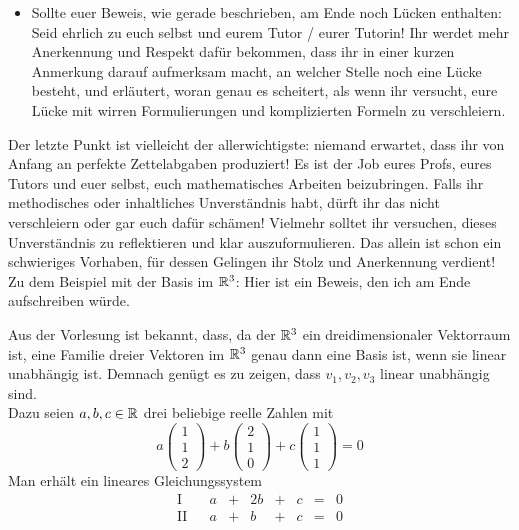 \begin{de}
\begin{itemize}
        \item Sollte euer Beweis, wie gerade beschrieben, am Ende noch Lücken enthalten: Seid ehrlich zu euch selbst und eurem Tutor / eurer Tutorin! Ihr werdet mehr Anerkennung und Respekt dafür bekommen, dass ihr in einer kurzen Anmerkung darauf aufmerksam macht, an welcher Stelle noch eine Lücke besteht, und erläutert, woran genau es scheitert, als wenn ihr versucht, eure Lücke mit wirren Formulierungen und komplizierten Formeln zu verschleiern.
    \end{itemize}
    Der letzte Punkt ist vielleicht der allerwichtigste: niemand erwartet, dass ihr von Anfang an perfekte Zettelabgaben produziert! Es ist der Job eures Profs,  eures Tutors und euer selbst, euch mathematisches Arbeiten beizubringen. Falls ihr methodisches oder inhaltliches Unverständnis habt, dürft ihr das nicht verschleiern oder gar euch dafür schämen! Vielmehr solltet ihr versuchen, dieses Unverständnis zu reflektieren und klar auszuformulieren. Das allein ist schon ein schwieriges Vorhaben, für dessen Gelingen ihr Stolz und Anerkennung verdient! \\[0.5em]
    Zu dem Beispiel mit der Basis im $\mathbb R^3$: Hier ist ein Beweis, den ich am Ende aufschreiben würde.
    \begin{bew}
        Aus der Vorlesung ist bekannt, dass, da der $\mathbb R^3$ ein dreidimensionaler Vektorraum ist, eine Familie dreier Vektoren im $\mathbb R^3$ genau dann eine Basis ist, wenn sie linear unabhängig ist. Demnach genügt es zu zeigen, dass $v_1,v_2,v_3$ linear unabhängig sind. \\[0.5em]
        Dazu seien $a,b,c\in \mathbb R$ drei beliebige reelle Zahlen mit
            \[ a\begin{pmatrix} 1 \\ 1 \\ 2 \end{pmatrix} + b \begin{pmatrix} 2 \\ 1 \\ 0 \end{pmatrix}+c \begin{pmatrix} 1 \\ 1 \\ 1 \end{pmatrix} = 0  \]
        Man erhält ein lineares Gleichungssystem
        \[\begin{array}{rcccccccc}
            \text{I} &&    a &+& 2b &+& c &=& 0 \\
            \text{II}&& a &+& b &+& c & =& 0 \\

\end{array}\]
\end{bew}
\end{de}

